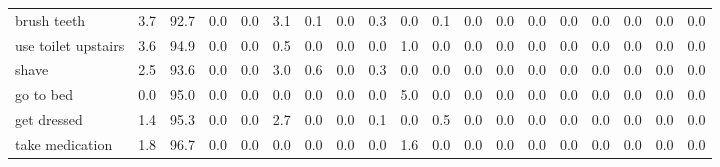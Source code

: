 \documentclass{article}
\begin{document}
\begin{sideways}
\begin{tabular}{lrrrrrrrrrrrrrrrrrr}
brush teeth                   &         3.7 &               92.7 &           0.0 &                          0.0 &                3.1 &                0.1 &                        0.0 &          0.3 &              0.0 &                0.1 &                    0.0 &                      0.0 &                  0.0 &                   0.0 &              0.0 &              0.0 &                                  0.0 &          0.0 \\
use toilet upstairs           &         3.6 &               94.9 &           0.0 &                          0.0 &                0.5 &                0.0 &                        0.0 &          0.0 &              1.0 &                0.0 &                    0.0 &                      0.0 &                  0.0 &                   0.0 &              0.0 &              0.0 &                                  0.0 &          0.0 \\
shave                         &         2.5 &               93.6 &           0.0 &                          0.0 &                3.0 &                0.6 &                        0.0 &          0.3 &              0.0 &                0.0 &                    0.0 &                      0.0 &                  0.0 &                   0.0 &              0.0 &              0.0 &                                  0.0 &          0.0 \\
go to bed                     &         0.0 &               95.0 &           0.0 &                          0.0 &                0.0 &                0.0 &                        0.0 &          0.0 &              5.0 &                0.0 &                    0.0 &                      0.0 &                  0.0 &                   0.0 &              0.0 &              0.0 &                                  0.0 &          0.0 \\
get dressed                   &         1.4 &               95.3 &           0.0 &                          0.0 &                2.7 &                0.0 &                        0.0 &          0.1 &              0.0 &                0.5 &                    0.0 &                      0.0 &                  0.0 &                   0.0 &              0.0 &              0.0 &                                  0.0 &          0.0 \\
take medication               &         1.8 &               96.7 &           0.0 &                          0.0 &                0.0 &                0.0 &                        0.0 &          0.0 &              1.6 &                0.0 &                    0.0 &                      0.0 &                  0.0 &                   0.0 &              0.0 &              0.0 &                                  0.0 &          0.0 \\

\end{tabular}
\end{sideways}
\end{document}
